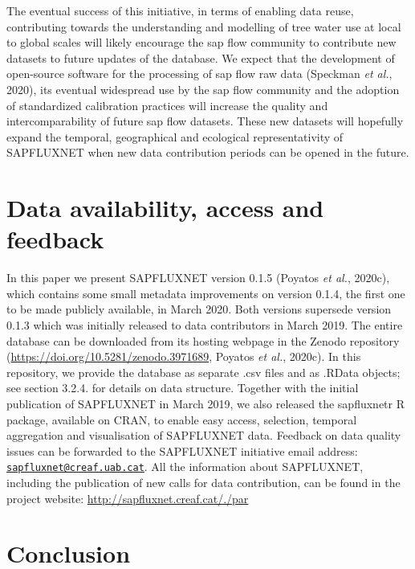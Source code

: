 \documentclass[11pt,twoside]{reedthesis}
\begin{document}
The eventual success of this initiative, in terms of enabling data
reuse, contributing towards the understanding and modelling of tree
water use at local to global scales will likely encourage the sap flow
community to contribute new datasets to future updates of the database.
We expect that the development of open-source software for the
processing of sap flow raw data (Speckman \emph{et al.}, 2020), its
eventual widespread use by the sap flow community and the adoption of
standardized calibration practices will increase the quality and
intercomparability of future sap flow datasets. These new datasets will
hopefully expand the temporal, geographical and ecological
representativity of SAPFLUXNET when new data contribution periods can be
opened in the future.\par

\section{Data availability, access and
feedback}\label{data-availability-access-and-feedback}

In this paper we present SAPFLUXNET version 0.1.5 (Poyatos \emph{et
al.}, 2020c), which contains some small metadata improvements on version
0.1.4, the first one to be made publicly available, in March 2020. Both
versions supersede version 0.1.3 which was initially released to data
contributors in March 2019. The entire database can be downloaded from
its hosting webpage in the Zenodo repository
(\url{https://doi.org/10.5281/zenodo.3971689}, Poyatos \emph{et al.},
2020c). In this repository, we provide the database as separate .csv
files and as .RData objects; see section 3.2.4. for details on data
structure. Together with the initial publication of SAPFLUXNET in March
2019, we also released the sapfluxnetr R package, available on CRAN, to
enable easy access, selection, temporal aggregation and visualisation of
SAPFLUXNET data. Feedback on data quality issues can be forwarded to the
SAPFLUXNET initiative email address:
\href{mailto:sapfluxnet@creaf.uab.cat}{\nolinkurl{sapfluxnet@creaf.uab.cat}}.
All the information about SAPFLUXNET, including the publication of new
calls for data contribution, can be found in the project website:
\url{http://sapfluxnet.creaf.cat/./par}

\section{Conclusion}\label{conclusion}
\end{document}
